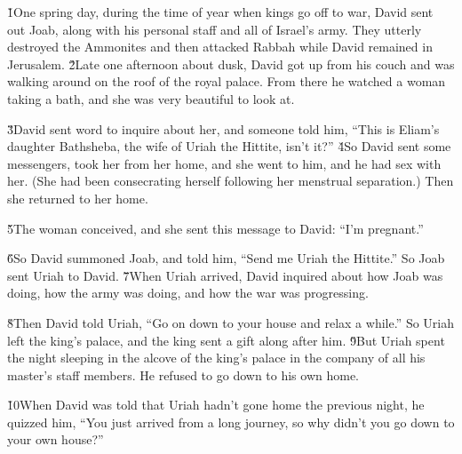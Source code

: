 \v{1}One spring day, during the time of year when kings go off to war, David sent out Joab, along with his personal staff and all of Israel's army. They utterly destroyed the Ammonites and then attacked Rabbah while David remained in Jerusalem. \v{2}Late one afternoon about dusk, David got up from his couch and was walking around on the roof of the royal palace. From there he watched a woman taking a bath, and she was very beautiful to look at.

\v{3}David sent word to inquire about her, and someone told him, ``This is Eliam's daughter Bathsheba, the wife of Uriah the Hittite, isn't it?'' \v{4}So David sent some messengers, took her from her home, and she went to him, and he had sex with her. (She had been consecrating herself following her menstrual separation.) Then she returned to her home.

\v{5}The woman conceived, and she sent this message to David: ``I'm pregnant.''

\v{6}So David summoned Joab, and told him, ``Send me Uriah the Hittite.'' So Joab sent Uriah to David. \v{7}When Uriah arrived, David inquired about how Joab was doing, how the army was doing, and how the war was progressing.

\v{8}Then David told Uriah, ``Go on down to your house and relax a while.'' So Uriah left the king's palace, and the king sent a gift along after him. \v{9}But Uriah spent the night sleeping in the alcove of the king's palace in the company of all his master's staff members. He refused to go down to his own home.

\v{10}When David was told that Uriah hadn't gone home the previous night, he quizzed him, ``You just arrived from a long journey, so why didn't you go down to your own house?''


